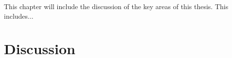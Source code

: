 This chapter will include the discussion of the key areas of this thesis. This includes...

\section{Discussion}